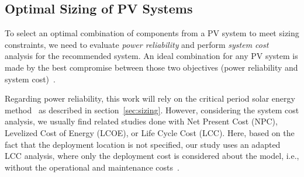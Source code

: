 \documentclass[10pt,conference]{IEEEtran}
\begin{document}
\subsection{Optimal Sizing of PV Systems}
%
To select an optimal combination of components from a PV system to meet sizing constraints, we need to evaluate \textit{power reliability} and perform \textit{system cost} analysis for the recommended system. An ideal combination for any PV system is made by the best compromise between those two objectives (power reliability and system cost)~\cite{Alsadi2018}. 

Regarding power reliability, this work will rely on the critical period solar energy method~\cite{Pinho} as described in section~\ref{sec:sizing}. 
However, considering the system cost analysis, we usually find related studies done with Net Present Cost (NPC), Levelized Cost of Energy (LCOE), or Life Cycle Cost (LCC). Here, based on the fact that the deployment location is not specified, our study uses an adapted LCC analysis, where only the deployment cost is considered about the model, i.e., without the operational and maintenance costs~\cite{Alsadi2018}.
\end{document}
